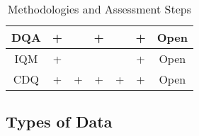 \documentclass[pdftex,english,oribibl]{llncs}
\begin{document}
\begin{table}[]
\begin{tabular}{|c|c|c|c|c|c|c|}
DQA                                                         & +                                                       &                                                                     & +                                                                          &                                                            & +                                                                & Open                                                                                      \\ \hline
IQM                                                         & +                                                       &                                                                     &                                                                            &                                                            & +                                                                & Open                                                                                      \\ \hline
CDQ                                                         & +                                                       & +                                                                   & +                                                                          & +                                                          & +                                                                & Open                                                                                      \\ \hline
\end{tabular}
\caption{Methodologies and Assessment Steps}
\label{table:assessmentstep}
\end{table}

\subsection{Types of Data}
\end{document}
